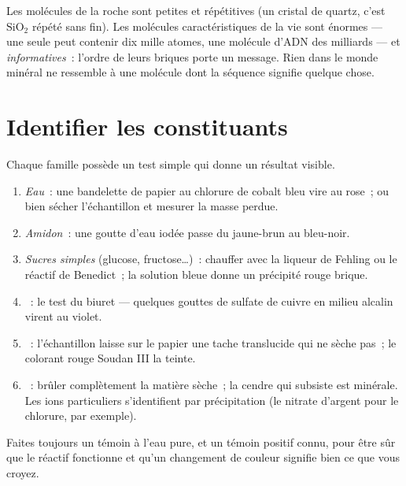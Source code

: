 \begin{remark}\label{rem:g10:chemistry-of-life:macromolecules}
Les molécules de la roche sont petites et répétitives (un cristal de
quartz, c'est $\mathrm{SiO_2}$ répété sans fin). Les molécules
caractéristiques de la vie sont énormes --- une seule  peut
contenir dix mille atomes, une molécule d'ADN des milliards --- et
\emph{informatives}~: l'ordre de leurs briques porte un message. Rien
dans le monde minéral ne ressemble à une molécule dont la séquence
signifie quelque chose.
\end{remark}

\section{Identifier les constituants}

\begin{method}\label{met:g10:chemistry-of-life:tests}
Chaque famille possède un test simple qui donne un résultat visible.
\begin{enumerate}
  \item \emph{Eau}~: une bandelette de papier au chlorure de cobalt
        bleu vire au rose~; ou bien sécher l'échantillon et mesurer la
        masse perdue.
  \item \emph{Amidon}~: une goutte d'eau iodée passe du jaune-brun au
        bleu-noir.
  \item \emph{Sucres simples} (glucose, fructose\dots)~: chauffer avec
        la liqueur de Fehling ou le réactif de Benedict~; la solution
        bleue donne un précipité rouge brique.
  \item \emph{}~: le test du biuret --- quelques gouttes de
        sulfate de cuivre en milieu alcalin virent au violet.
  \item \emph{}~: l'échantillon laisse sur le papier une tache
        translucide qui ne sèche pas~; le colorant rouge Soudan III la
        teinte.
  \item \emph{}~: brûler complètement la matière sèche~;
        la cendre qui subsiste est minérale. Les ions particuliers
        s'identifient par précipitation (le nitrate d'argent pour le
        chlorure, par exemple).
\end{enumerate}
Faites toujours un témoin à l'eau pure, et un témoin positif connu,
pour être sûr que le réactif fonctionne et qu'un changement de couleur
signifie bien ce que vous croyez.
\end{method}

